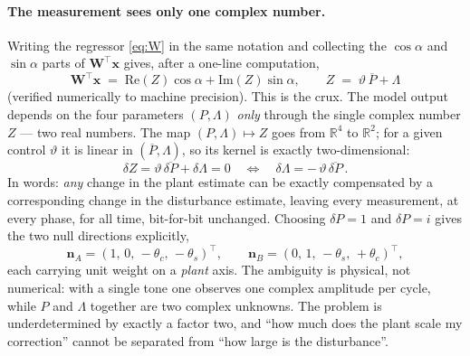 \documentclass[11pt]{article}
\newcommand{\vx}{\mathbf{x}}
\newcommand{\vW}{\mathbf{W}}
\newcommand{\vn}{\mathbf{n}}
\begin{document}
\paragraph{The measurement sees only one complex number.}
Writing the regressor \eqref{eq:W} in the same notation and collecting the
$\cos\alpha$ and $\sin\alpha$ parts of $\vW^{\!\top}\vx$ gives, after a
one-line computation,
\begin{equation}
  \boxed{\;\vW^{\!\top}\vx \;=\; \mathrm{Re}(Z)\cos\alpha+\mathrm{Im}(Z)\sin\alpha,
  \qquad Z \;=\; \vartheta\,\overline{P}+\Lambda \;}
  \label{eq:Z}
\end{equation}
(verified numerically to machine precision). This is the crux. The model
output depends on the four parameters $(P,\Lambda)$ \emph{only} through the
single complex number $Z$ --- two real numbers. The map
$(P,\Lambda)\mapsto Z$ goes from $\mathbb{R}^4$ to $\mathbb{R}^2$; for a
given control $\vartheta$ it is linear in $(\overline{P},\Lambda)$, so its
kernel is exactly two-dimensional:
\begin{equation}
  \delta Z = \vartheta\,\overline{\delta P}+\delta\Lambda = 0
  \quad\Longleftrightarrow\quad
  \delta\Lambda = -\,\vartheta\,\overline{\delta P}\, .
  \label{eq:kernel}
\end{equation}
In words: \emph{any} change in the plant estimate can be exactly
compensated by a corresponding change in the disturbance estimate, leaving
every measurement, at every phase, for all time, bit-for-bit unchanged.
Choosing $\delta P=1$ and $\delta P=i$ gives the two null directions
explicitly,
\begin{equation}
  \vn_A=(1,\,0,\,-\theta_c,\,-\theta_s)^{\!\top},
  \qquad
  \vn_B=(0,\,1,\,-\theta_s,\,+\theta_c)^{\!\top},
  \label{eq:nulldirs}
\end{equation}
each carrying unit weight on a \emph{plant} axis. The ambiguity is
physical, not numerical: with a single tone one observes one complex
amplitude per cycle, while $P$ and $\Lambda$ together are two complex
unknowns. The problem is underdetermined by exactly a factor two, and
``how much does the plant scale my correction'' cannot be separated from
``how large is the disturbance''.
\end{document}
